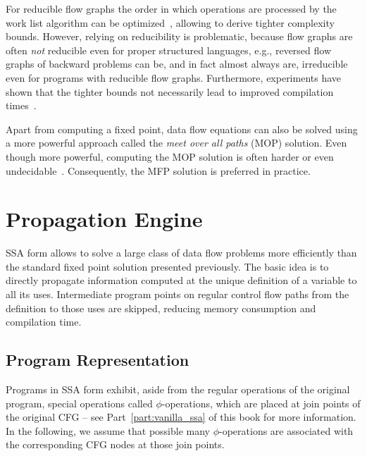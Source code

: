 For reducible flow graphs the order in which operations are processed by the
work list algorithm can be
optimized~\cite{novillo:bib:HU73,novillo:bib:KU76,novillo:bib:NNH99}, allowing
to derive tighter complexity bounds. However, relying on reducibility is
problematic, because flow graphs are often \emph{not} reducible even for proper
structured languages, e.g., reversed flow graphs of backward problems can be,
and in fact almost always are, irreducible even for programs with reducible flow
graphs. Furthermore, experiments have shown that the tighter bounds not
necessarily lead to improved compilation times~\cite{novillo:bib:CTK06}.

Apart from computing a fixed point, data flow equations can also be solved using
a more powerful approach called the \emph{meet over all paths} (MOP) solution.
Even though more powerful, computing the MOP solution is often harder or even
undecidable~\cite{novillo:bib:NNH99}. Consequently, the MFP solution is
preferred in practice.

\section{Propagation Engine}
\label{novillo:sec:prop-engine} 

SSA form allows to solve a large class of data flow problems more efficiently
than the standard fixed point solution presented previously. The basic idea is
to directly propagate information computed at the unique definition of a
variable to all its uses. Intermediate program points on regular control flow
paths from the definition to those uses are skipped, reducing memory consumption
and compilation time.

\subsection{Program Representation}

Programs in SSA form exhibit, aside from the regular operations of the original
program, special operations called $\phi$-operations, which are placed at join
points of the original CFG -- see Part~\ref{part:vanilla_ssa} of this book for
more information. In the following, we assume that possible many
$\phi$-operations are associated with the corresponding CFG nodes at those
join points.

